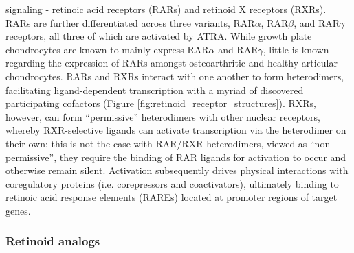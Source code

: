 \begin{refsection}
signaling - retinoic acid receptors (RARs) and retinoid X receptors (RXRs). RARs
are further differentiated across three variants, RAR${\alpha}$, RAR${\beta}$,
and RAR${\gamma}$ receptors, all three of which are activated by
ATRA.\cite{Chambon1996} While growth plate chondrocytes are known to mainly
express RAR${\alpha}$ and RAR${\gamma}$,\cite{Koyama1999} little is known
regarding the expression of RARs amongst osteoarthritic and healthy articular
chondrocytes. RARs and RXRs interact with one another to form heterodimers,
facilitating ligand-dependent transcription with a myriad of discovered
participating cofactors (Figure \ref{fig:retinoid_receptor_structures}). RXRs, however,
can form ``permissive'' heterodimers with other nuclear receptors, whereby
RXR-selective ligands can activate transcription via the heterodimer on their
own; this is not the case with RAR/RXR heterodimers, viewed as
``non-permissive'', they require the binding of RAR ligands for activation to
occur and otherwise remain silent.\cite{Altucci2007} Activation subsequently
drives physical interactions with coregulatory proteins (i.e. corepressors and
coactivators), ultimately binding to retinoic acid response elements (RAREs)
located at promoter regions of target genes.\cite{Germain2002,DeLera2007}

\subsubsection{Retinoid analogs}


\end{refsection}
